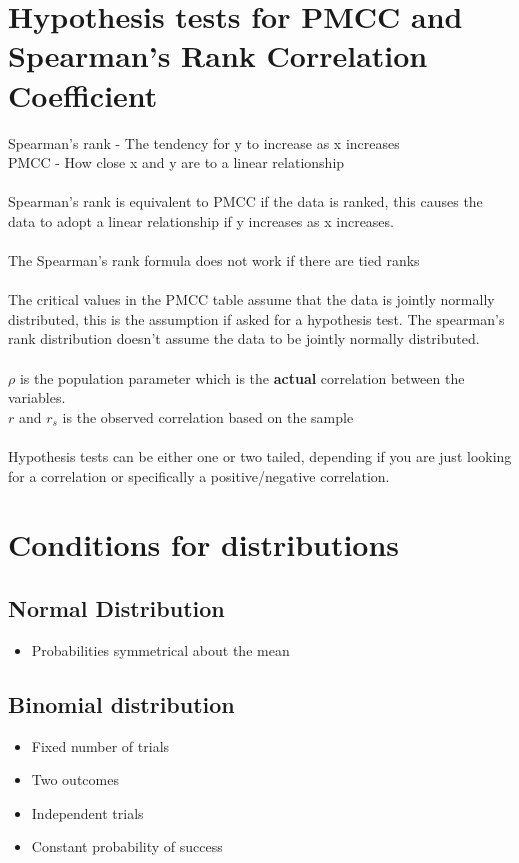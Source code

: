 \documentclass{article}[18pt]
\begin{document}
\section{Hypothesis tests for PMCC and Spearman's Rank Correlation Coefficient}
Spearman's rank - The tendency for y to increase as x increases\\
PMCC - How close x and y are to a linear relationship\\
\\
Spearman's rank is equivalent to PMCC if the data is ranked, this causes the data to adopt a linear relationship if y increases as x increases.\\
\\
The Spearman's rank formula does not work if there are tied ranks\\
\\
The critical values in the PMCC table assume that the data is jointly normally distributed, this is the assumption if asked for a hypothesis test. The spearman's rank distribution doesn't assume the data to be jointly normally distributed.\\
\\
$\rho$ is the population parameter which is the \textbf{actual} correlation between the variables.\\
$r$ and $r_s$ is the observed correlation based on the sample\\
\\
Hypothesis tests can be either one or two tailed, depending if you are just looking for a correlation or specifically a positive/negative correlation.
\newpage
\section{Conditions for distributions}
\subsection{Normal Distribution}
\begin{itemize}
\item Probabilities symmetrical about the mean
\end{itemize}
\subsection{Binomial distribution}
\begin{itemize}
\item Fixed number of trials
\item Two outcomes
\item Independent trials
\item Constant probability of success 
\end{itemize}
\end{document}
